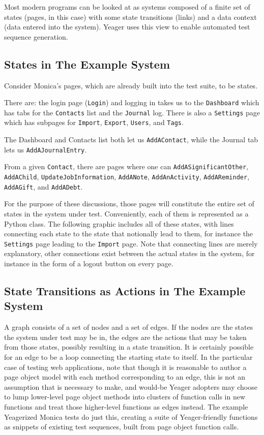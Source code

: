 Most modern programs can be looked at as systems composed of a finite set of states (pages, in this case) with some state transitions (links) and a data context (data entered into the system). Yeager uses this view to enable automated test sequence generation.

\subsection{States in The Example System}
Consider Monica's pages, which are already built into the test suite, to be states.

There are: the login page (\texttt{Login}) and logging in takes us to the \texttt{Dashboard} which has tabs for the \texttt{Contacts} list and the \texttt{Journal} log. There is also a \texttt{Settings} page which has subpages for \texttt{Import}, \texttt{Export}, \texttt{Users}, and \texttt{Tags}.

The Dashboard and Contacts list both let us \texttt{AddAContact}, while the Journal tab lets us \texttt{AddAJournalEntry}.

From a given \texttt{Contact}, there are pages where one can \texttt{AddASignificantOther}, \texttt{AddAChild}, \texttt{UpdateJobInformation}, \texttt{AddANote}, \texttt{AddAnActivity}, \texttt{AddAReminder}, \texttt{AddAGift}, and \texttt{AddADebt}.

For the purpose of these discussions, those pages will constitute the entire set of states in the system under test. Conveniently, each of them is represented as a Python class. The following graphic includes all of these states, with lines connecting each state to the state that notionally lead to them, for instance the \texttt{Settings} page leading to the \texttt{Import} page. Note that connecting lines are merely explanatory, other connections exist between the actual states in the system, for instance in the form of a logout button on every page.

\noindent{}

\subsection{State Transitions as Actions in The Example System}
A graph consists of a set of nodes and a set of edges. If the nodes are the states the system under test may be in, the edges are the actions that may be taken from those states, possibly resulting in a state transition. It is certainly possible for an edge to be a loop connecting the starting state to itself. In the particular case of testing web applications, note that though it is reasonable to author a page object model with each method corresponding to an edge, this is not an assumption that is necessary to make, and would-be Yeager adopters may choose to lump lower-level page object methods into clusters of function calls in new functions and treat those higher-level functions as edges instead. The example Yeagerized Monica tests do just this, creating a suite of Yeager-friendly functions as snippets of existing test sequences, built from page object function calls.

